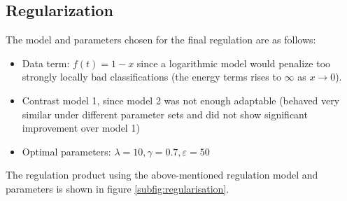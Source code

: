 \documentclass[10pt]{article}
\begin{document}
\subsection{Regularization}

The model and parameters chosen for the final regulation are as follows:
\begin{itemize}
    \item Data term: $f(t)=1-x$ since a logarithmic model would penalize too strongly locally bad classifications (the energy terms rises to $\infty$ as $x\rightarrow 0$).
    \item Contrast model 1, since model 2 was not enough adaptable (behaved very similar under different parameter sets and did not show significant improvement over model 1)
    \item Optimal parameters: $\lambda = 10, \gamma = 0.7, \varepsilon = 50$
\end{itemize}
The regulation product using the above-mentioned regulation model and parameters is shown in figure \ref{subfig:regularisation}.
\end{document}
